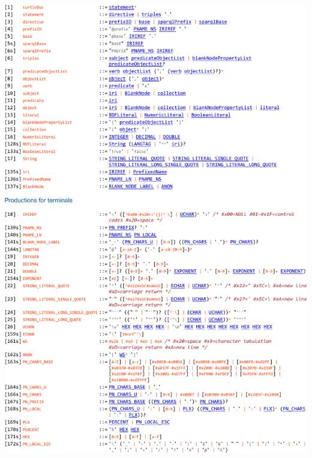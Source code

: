 \documentclass[oneside]{book}
\begin{document}
%
%
%
%
%
%

\includegraphics[width=\linewidth,height=\textheight,keepaspectratio]{Turtle_Grammar.pdf}
\end{document}
